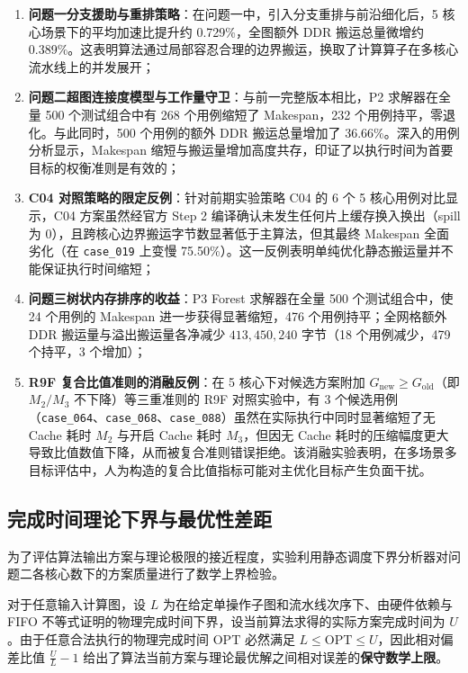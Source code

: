 \documentclass[anonymous,notoc]{gmcm2026}
\providecommand{\tightlist}{\setlength{\itemsep}{0pt}\setlength{\parskip}{0pt}}
\begin{document}
\begin{enumerate}
\def\labelenumi{\arabic{enumi}.}
\tightlist
\item
  \textbf{问题一分支援助与重排策略}：在问题一中，引入分支重排与前沿细化后，5 核心场景下的平均加速比提升约 0.729\%，全图额外 DDR 搬运总量微增约 0.389\%。这表明算法通过局部容忍合理的边界搬运，换取了计算算子在多核心流水线上的并发展开；
\item
  \textbf{问题二超图连接度模型与工作量守卫}：与前一完整版本相比，P2 求解器在全量 500 个测试组合中有 268 个用例缩短了 Makespan，232 个用例持平，零退化。与此同时，500 个用例的额外 DDR 搬运总量增加了 36.66\%。深入的用例分析显示，Makespan 缩短与搬运量增加高度共存，印证了以执行时间为首要目标的权衡准则是有效的；
\item
  \textbf{C04 对照策略的限定反例}：针对前期实验策略 C04 的 6 个 5 核心用例对比显示，C04 方案虽然经官方 Step 2 编译确认未发生任何片上缓存换入换出（spill 为 0），且跨核心边界搬运字节数显著低于主算法，但其最终 Makespan 全面劣化（在 \texttt{case\_019} 上变慢 75.50\%）。这一反例表明单纯优化静态搬运量并不能保证执行时间缩短；
\item
  \textbf{问题三树状内存排序的收益}：P3 Forest 求解器在全量 500 个测试组合中，使 24 个用例的 Makespan 进一步获得显著缩短，476 个用例持平；全网格额外 DDR 搬运量与溢出搬运量各净减少 \(413{,}450{,}240\) 字节（18 个用例减少，479 个持平，3 个增加）；
\item
  \textbf{R9F 复合比值准则的消融反例}：在 5 核心下对候选方案附加 \(G_{\mathrm{new}} \ge G_{\mathrm{old}}\)（即 \(M_2/M_3\) 不下降）等三重准则的 R9F 对照实验中，有 3 个候选用例（\texttt{case\_064}、\texttt{case\_068}、\texttt{case\_088}）虽然在实际执行中同时显著缩短了无 Cache 耗时 \(M_2\) 与开启 Cache 耗时 \(M_3\)，但因无 Cache 耗时的压缩幅度更大导致比值数值下降，从而被复合准则错误拒绝。该消融实验表明，在多场景多目标评估中，人为构造的复合比值指标可能对主优化目标产生负面干扰。
\end{enumerate}

\subsection{完成时间理论下界与最优性差距}

为了评估算法输出方案与理论极限的接近程度，实验利用静态调度下界分析器对问题二各核心数下的方案质量进行了数学上界检验。

对于任意输入计算图，设 \(L\) 为在给定单操作子图和流水线次序下、由硬件依赖与 FIFO 不等式证明的物理完成时间下界，设当前算法求得的实际方案完成时间为 \(U\)。由于任意合法执行的物理完成时间 \(\mathrm{OPT}\) 必然满足 \(L \le \mathrm{OPT} \le U\)，因此相对偏差比值 \(\frac{U}{L} - 1\) 给出了算法当前方案与理论最优解之间相对误差的\textbf{保守数学上限}。
\end{document}
